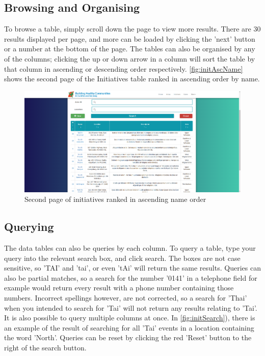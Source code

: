 \documentclass{bhcguides}
\begin{document}
\subsection{Browsing and Organising}
\label{ssec:browsingtables}

To browse a table, simply scroll down the page to view more results. There are 30 results displayed per page, and more can be loaded by clicking the 'next' button or a number at the bottom of the page. The tables can also be organised by any of the columns; clicking the up or down arrow in a column will sort the table by that column in ascending or descending order respectively. \autoref{fig:initAscName} shows the second page of the Initiatives table ranked in ascending order by name.

\begin{figure}[h!]
 \centerline{\includegraphics[width=\textwidth, height=\textheight, keepaspectratio]{initiativesnameascending.png}}
 \caption{Second page of initiatives ranked in ascending name order}
 \label{fig:initAscName}
\end{figure}

\pagebreak

\subsection{Querying}
\label{ssec:search}

The data tables can also be queries by each column. To query a table, type your query into the relevant search box, and click search. The boxes are not case sensitive, so 'TAI' and 'tai', or even 'tAi' will return the same results. Queries can also be partial matches, so a search for the number '0141' in a telephone field for example would return every result with a phone number containing those numbers. Incorrect spellings however, are not corrected, so a search for 'Thai' when you intended to search for 'Tai' will not return any results relating to 'Tai'. It is also possible to query multiple columns at once. In \autoref{fig:initSearch}), there is an example of the result of searching for all 'Tai' events in a location containing the word 'North'. Queries can be reset by clicking the red 'Reset' button to the right of the search button.
\end{document}

